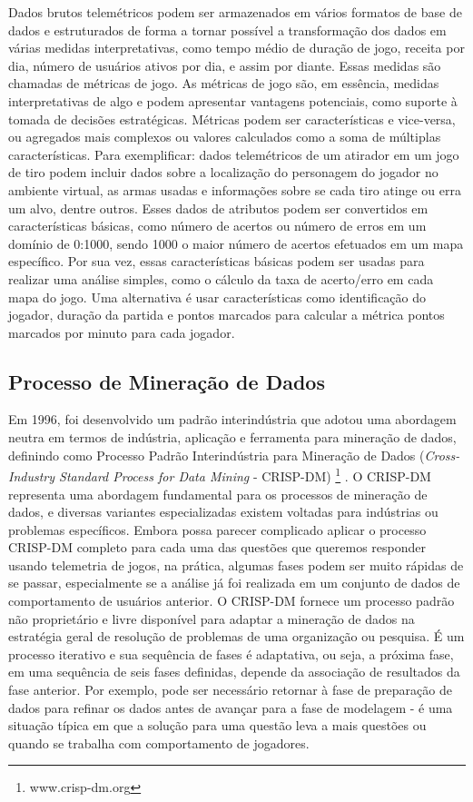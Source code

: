 Dados brutos telemétricos podem ser armazenados em vários formatos de base de dados e estruturados de forma a tornar possível a transformação dos dados em várias medidas interpretativas, como tempo médio de duração de jogo, receita por dia, número de usuários ativos por dia, e assim por diante. Essas medidas são chamadas de métricas de jogo. As métricas de jogo são, em essência, medidas interpretativas de algo e podem apresentar vantagens potenciais, como suporte à tomada de decisões estratégicas. Métricas podem ser características e vice-versa, ou agregados mais complexos ou valores calculados como a soma de múltiplas características. Para exemplificar: dados telemétricos de um atirador em um jogo de tiro podem incluir dados sobre a localização do personagem do jogador no ambiente virtual, as armas usadas e informações sobre se cada tiro atinge ou erra um alvo, dentre outros. Esses dados de atributos podem ser convertidos em características básicas, como número de acertos ou número de erros em um domínio de 0:1000, sendo 1000 o maior número de acertos efetuados em um mapa específico. Por sua vez, essas características básicas podem ser usadas para realizar uma análise simples, como o cálculo da taxa de acerto/erro em cada mapa do jogo. Uma alternativa é usar características como identificação do jogador, duração da partida e pontos marcados para calcular a métrica pontos marcados por minuto para cada jogador.

\subsection{Processo de Mineração de Dados}
Em 1996, foi desenvolvido um padrão interindústria que adotou uma abordagem neutra em termos de indústria, aplicação e ferramenta para mineração de dados, definindo como Processo Padrão Interindústria para Mineração de Dados (\textit{Cross-Industry Standard Process for Data Mining} - CRISP-DM) \footnote{www.crisp-dm.org} \cite{el2016game}. O CRISP-DM representa uma abordagem fundamental para os processos de mineração de dados, e diversas variantes especializadas existem voltadas para indústrias ou problemas específicos. Embora possa parecer complicado aplicar o processo CRISP-DM completo para cada uma das questões que queremos responder usando telemetria de jogos, na prática, algumas fases podem ser muito rápidas de se passar, especialmente se a análise já foi realizada em um conjunto de dados de comportamento de usuários anterior. O CRISP-DM fornece um processo padrão não proprietário e livre disponível para adaptar a mineração de dados na estratégia geral de resolução de problemas de uma organização ou pesquisa. É um processo iterativo e sua sequência de fases é adaptativa, ou seja, a próxima fase, em uma sequência de seis fases definidas, depende da associação de resultados da fase anterior. Por exemplo, pode ser necessário retornar à fase de preparação de dados para refinar os dados antes de avançar para a fase de modelagem - é uma situação típica em que a solução para uma questão leva a mais questões ou quando se trabalha com comportamento de jogadores.

